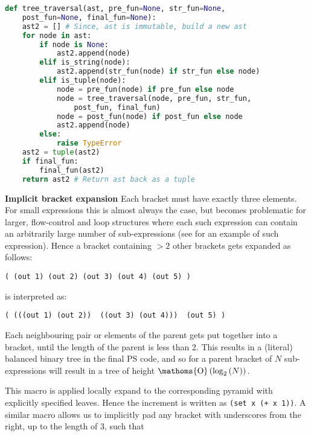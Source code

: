 \documentclass[aip,jcp,reprint,footinbib]{revtex4-1}
\DeclareMathOperator{\bigO}{\ensuremath{\mathoms{O}}}
\newcommand\psll{\texttt{psll}\xspace}
\newcommand{\ilpsll}[1]{\lstinline[language=psll,columns=flexible]{#1}}
\begin{document}
\begin{lstlisting}[language=python,
    label={lst:tree_traversal},caption={
    Core \psll function performing a depth-first walk through the abstract syntax tree and application of appropriate functions.
}]
def tree_traversal(ast, pre_fun=None, str_fun=None,
    post_fun=None, final_fun=None):
    ast2 = [] # Since, ast is immutable, build a new ast
    for node in ast:
        if node is None:
            ast2.append(node)
        elif is_string(node):
            ast2.append(str_fun(node) if str_fun else node)
        elif is_tuple(node):
            node = pre_fun(node) if pre_fun else node
            node = tree_traversal(node, pre_fun, str_fun, 
                post_fun, final_fun)
            node = post_fun(node) if post_fun else node
            ast2.append(node)
        else:
            raise TypeError
    ast2 = tuple(ast2)
    if final_fun:
        final_fun(ast2)
    return ast2 # Return ast back as a tuple
\end{lstlisting}

\textbf{Implicit bracket expansion} Each bracket must have exactly three elements. For small expressions this is almost always the case, but becomes problematic for larger, flow-control and loop structures where each such expression can contain an arbitrarily large number of sub-expressions (see  for an example of such expression). Hence a bracket containing $>2$ other brackets gets expanded as follows:
\begin{lstlisting}[language=psll,aboveskip=3pt,belowskip=-2pt,frame=none,numbers=none]
( (out 1) (out 2) (out 3) (out 4) (out 5) )
\end{lstlisting}
is interpreted as:
\begin{lstlisting}[language=psll,aboveskip=3pt,belowskip=-2pt,frame=none,numbers=none]
( (((out 1) (out 2))  ((out 3) (out 4)))  (out 5) )
\end{lstlisting}
Each neighbouring pair or elements of the parent gets put together into a bracket, until the length of the parent is less than 2. This results in a (literal) balanced binary tree in the final PS code, and so for a parent bracket of $N$ sub-expressions will result in a tree of height $\bigO\left(\log_2\left(N\right)\right)$.


This macro is applied locally expand to the corresponding pyramid with explicitly specified leaves. Hence the increment is written as \ilpsll{(set x (+ x 1))}. A similar macro allows us to implicitly pad any bracket with underscores from the right, up to the length of 3, such that 
\end{document}
